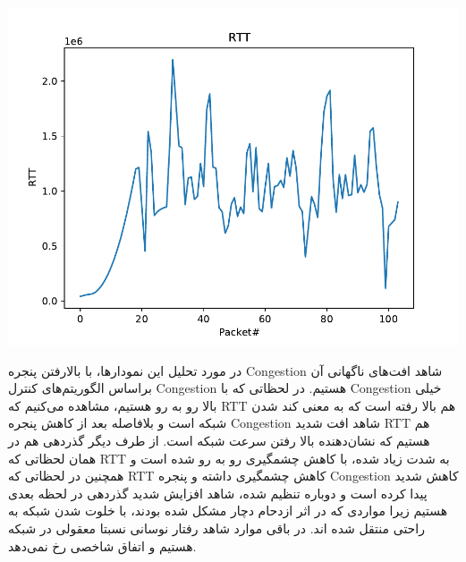 \documentclass[12pt]{article}
\begin{document}
\begin{enumerate}
\begin{center}
	\includegraphics[page=3, width = 0.6 \textwidth]{images/plots.pdf}
\end{center}

\end{enumerate}

در مورد تحلیل این نمودارها، با بالارفتن پنجره Congestion شاهد افت‌های ناگهانی آن براساس الگوریتم‌های کنترل Congestion هستیم. در لحظاتی که با Congestion خیلی بالا رو به رو هستیم، مشاهده می‌کنیم که RTT هم بالا رفته است که به معنی کند شدن شبکه است و بلافاصله بعد از کاهش پنجره Congestion شاهد افت شدید RTT هم هستیم که نشان‌دهنده بالا رفتن سرعت شبکه است. از طرف دیگر گذردهی هم در همان لحظاتی که RTT به شدت زیاد شده، با کاهش چشمگیری رو به رو شده است و همچنین در لحظاتی که RTT کاهش چشمگیری داشته و پنجره Congestion کاهش شدید پیدا کرده است و دوباره تنظیم شده، شاهد افزایش شدید  گذردهی در لحظه بعدی هستیم زیرا مواردی که در اثر ازدحام دچار مشکل شده بودند، با خلوت شدن شبکه به راحتی منتقل شده اند. در باقی موارد شاهد رفتار نوسانی نسبتا معقولی در شبکه هستیم و اتفاق شاخصی رخ نمی‌دهد.
\end{document}
